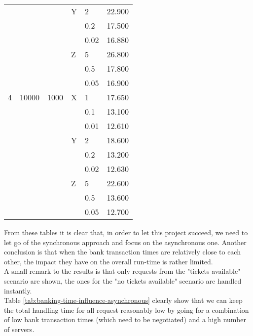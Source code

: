 \documentclass[10pt,a4paper,twocolumn]{article}
\begin{document}
\begin{table*}[t]
{\begin{tabular}{llllll}
									&									& 								  &Y				   & 2 							& 22.900 \\
									&									& 								  &						& 0.2 						& 17.500\\
									&									& 								  &						& 0.02 					   & 16.880 \\
									&									& 								  &Z				   & 5 							& 26.800 \\
									&									& 								  &						& 0.5 						& 17.800\\
									&									& 								  &						& 0.05 					   & 16.900\\
	4 								& 10000 					  & 1000 						& X					 & 1 						  & 17.650 \\
									&									& 								  &						& 0.1 						& 13.100 \\
									&									& 								  &						& 0.01 					   & 12.610 \\
									&									& 								  &Y				   & 2 							& 18.600 \\
									&									& 								  &						& 0.2 						& 13.200\\
									&									& 								  &						& 0.02 					   & 12.630 \\
									&									& 								  &Z				   & 5 							& 22.600 \\
									&									& 								  &						& 0.5 						& 13.600\\
									&									& 								  &						& 0.05 					   & 12.700\\
	\end{tabular}}
	\caption{\label{tab:banking-time-influence-asynchronous}Influence of transaction times in an asynchronous system.}
\end{table*}\noindent
From these tables it is clear that, in order to let this project succeed, we need to let go of the synchronous approach and focus on the asynchronous one. Another conclusion is that when the bank transaction times are relatively close to each other, the impact they have on the overall run-time is rather limited.\\
A small remark to the results is that only requests from the "tickets available" scenario are shown, the ones for the "no tickets available" scenario are handled instantly.\\
Table \ref{tab:banking-time-influence-asynchronous} clearly show that we can keep the total handling time for all request reasonably low by going for a combination of low bank transaction times (which need to be negotiated) and a high number of servers.
\end{document}
